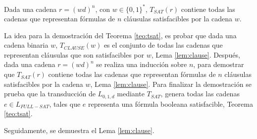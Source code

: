 \begin{lemma}
    \label{lem:sat}
    Dada una cadena $r=(wd)^n$, con $w\in\{0,1\}^*$, $T_{SAT}(r)$ contiene todas las cadenas que representan fórmulas de $n$ cláusulas satisfacibles por la cadena $w$.
\end{lemma}

La idea para la demostración del Teorema \ref{teo:tsat}, es probar que dada una cadena binaria $w$, $T_{CLAUSE}(w)$ es el conjunto de todas las cadenas que representan cláusulas que son satisfacibles por $w$, Lema \ref{lem:clause}.
Después, dada una cadena $r=(wd)^n$ se realiza una inducción sobre  $n$, para demostrar que $T_{SAT}(r)$ contiene todas las cadenas que representan fórmulas de $n$ cláusulas satisfacibles por la cadena $w$, Lema \ref{lem:clause}.
Para finalizar la demostración se prueba que la transducción de $L_{0,1,d}$ mediante $T_{SAT}$, genera todas las cadenas
$e\in L_{FULL-SAT}$, tales que $e$ representa una fórmula booleana satisfacible, Teorema \ref{teo:tsat}.

Seguidamente, se demuestra el Lema \ref{lem:clause}.

